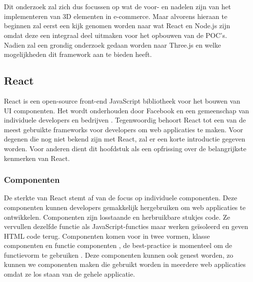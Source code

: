 \chapter{}%
\label{ch:stand-van-zaken}



Dit onderzoek zal zich dus focussen op wat de voor- en nadelen zijn van het implementeren van 3D elementen in e-commerce. Maar alvorens hieraan te beginnen zal eerst een kijk genomen worden naar wat React en Node.js zijn omdat deze een integraal deel uitmaken voor het opbouwen van de POC's. Nadien zal een grondig onderzoek gedaan worden naar Three.js en welke mogelijkheden dit framework aan te bieden heeft.

\section{React}

React is een open-source front-end JavaScript bibliotheek voor het bouwen van UI componenten. Het wordt onderhouden door Facebook en een gemeenschap van individuele developers en bedrijven \autocite{Bhupati2021}. Tegenwoordig behoort React tot een van de meest gebruikte frameworks voor developers om web applicaties te maken. Voor degenen die nog niet bekend zijn met React, zal er een korte introductie gegeven worden. Voor anderen dient dit hoofdstuk als een opfrissing over de belangrijkste kenmerken van React.

\subsection{Componenten}
De sterkte van React stemt af van de focus op individuele componenten. Deze componenten kunnen developers gemakkelijk hergebruiken om web applicaties te ontwikkelen. Componenten zijn losstaande en herbruikbare stukjes code. Ze vervullen dezelfde functie als JavaScript-functies maar werken geïsoleerd en geven HTML code terug. Componenten komen voor in twee vormen, klasse componenten en functie componenten , de best-practice is momenteel om de functievorm te gebruiken \autocite{W3Schools2023}. Deze componenten kunnen ook genest worden, zo kunnen we componenten maken die gebruikt worden in meerdere web applicaties omdat ze los staan van de gehele applicatie.

